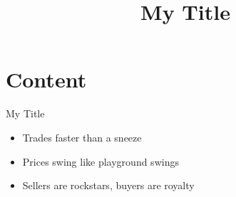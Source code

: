 \documentclass{beamer}
\begin{document}
\title{My Title}
\author{}
\date{}
\maketitle

\newpage

\section*{Content}

\begin{frame}{My Title}
    \begin{itemize}
        \item Trades faster than a sneeze
        \item Prices swing like playground swings
        \item Sellers are rockstars, buyers are royalty
    \end{itemize}
\end{frame}
\end{document}
